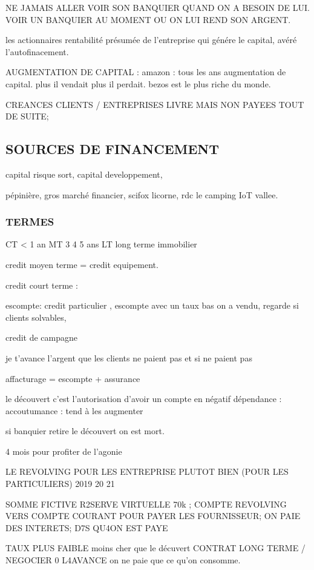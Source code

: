 \documentclass[a4paper,12pt]{article}
\begin{document}
NE JAMAIS ALLER VOIR SON BANQUIER QUAND ON A BESOIN DE LUI.
VOIR UN BANQUIER AU MOMENT OU ON LUI REND SON ARGENT.


les actionnaires rentabilité présumée de l'entreprise qui génére le capital, avéré  l'autofinacement. 



AUGMENTATION DE CAPITAL :
amazon : tous les ans augmentation de capital.
plus il vendait plus il perdait. bezos est le plus riche du monde.


CREANCES CLIENTS / ENTREPRISES LIVRE MAIS NON PAYEES TOUT DE SUITE;

\subsection{SOURCES DE FINANCEMENT}

capital risque sort, capital developpement,

pépinière, gros marché financier, scifox licorne, rdc le camping IoT vallee.

\subsubsection{TERMES}
 CT < 1 an
 MT 3 4 5 ans
 LT long terme immobilier


credit moyen terme = credit equipement.

credit court terme :

escompte: credit particulier , escompte avec un taux bas
on a vendu, regarde si clients solvables,

credit de campagne

je t'avance l'argent que les clients ne paient pas et si ne paient pas

affacturage = escompte + assurance



le découvert c'est l'autorisation d'avoir un compte en négatif
dépendance : 
accoutumance : tend à les augmenter

si banquier retire le découvert on est mort.

4 mois pour profiter de l'agonie


LE REVOLVING POUR LES ENTREPRISE PLUTOT BIEN (POUR LES PARTICULIERS)
2019 20 21

SOMME FICTIVE R2SERVE VIRTUELLE 70k ;  COMPTE REVOLVING VERS COMPTE COURANT POUR PAYER LES FOURNISSEUR;
ON PAIE DES INTERETS; D7S QU4ON EST PAYE 

TAUX PLUS FAIBLE moins cher que le décuvert
CONTRAT LONG TERME / NEGOCIER 0 L4AVANCE 
on ne paie que ce qu'on consomme.
\end{document}
